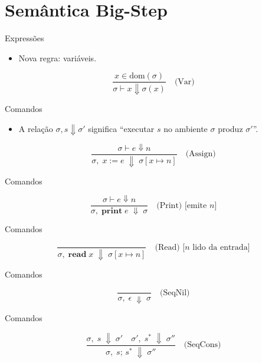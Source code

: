 \section{Semântica Big-Step}\label{semuxe2ntica-big-step}

\begin{frame}{Expressões}

    \begin{itemize}

        \item
        Nova regra: variáveis.
    \end{itemize}

    \[\frac{x \in \mathrm{dom}(\sigma)}{\sigma \vdash x \Downarrow \sigma(x)} \quad\text{(Var)}\]
\end{frame}

\begin{frame}{Comandos}

    \begin{itemize}

        \item
        A relação \(\sigma, s \Downarrow \sigma'\) significa ``executar \(s\)
        no ambiente \(\sigma\) produz \(\sigma'\)''.
    \end{itemize}

    \[\frac{\sigma \vdash e \Downarrow n}
    {\sigma,\; x \mathbin{:=} e \;\Downarrow\; \sigma[x \mapsto n]}
    \quad\text{(Assign)}
    \]
\end{frame}

\begin{frame}{Comandos}

    \[
    \frac{\sigma \vdash e \Downarrow n}
    {\sigma,\; \mathbf{print}\; e \;\Downarrow\; \sigma}
    \quad\text{(Print) [emite } n\text{]}\]
\end{frame}

\begin{frame}{Comandos}

    \[\frac{}{\sigma,\; \mathbf{read}\; x \;\Downarrow\; \sigma[x \mapsto n]}
    \quad\text{(Read) [} n\text{ lido da entrada]}\]
\end{frame}

\begin{frame}{Comandos}

    \[\frac{}{\sigma,\; \epsilon \;\Downarrow\; \sigma}
    \quad\text{(SeqNil)}
    \]
\end{frame}

\begin{frame}{Comandos}

    \[
    \frac{\sigma,\; s \;\Downarrow\; \sigma' \quad \sigma',\; s^* \;\Downarrow\; \sigma''}
    {\sigma,\; s;\, s^* \;\Downarrow\; \sigma''}
    \quad\text{(SeqCons)}\]
\end{frame}

